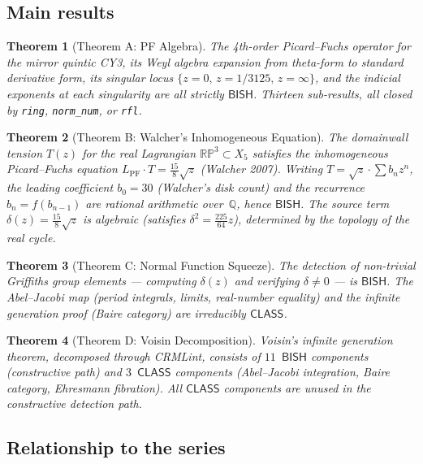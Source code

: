 \documentclass[11pt]{article}
\theoremstyle{plain}
\newtheorem{theorem}{Theorem}[section]
\theoremstyle{definition}
\theoremstyle{remark}
\newcommand{\Q}{\mathbb{Q}}
\newcommand{\R}{\mathbb{R}}
\newcommand{\PP}{\mathbb{P}}
\newcommand{\BISH}{\ensuremath{\mathsf{BISH}}}
\newcommand{\CLASS}{\ensuremath{\mathsf{CLASS}}}
\begin{document}
\subsection{Main results}

\begin{theorem}[Theorem A: PF Algebra]
The 4th-order Picard--Fuchs operator for the mirror quintic CY3, its Weyl algebra expansion from theta-form to standard derivative form, its singular locus $\{z = 0,\, z = 1/3125,\, z = \infty\}$, and the indicial exponents at each singularity are all strictly $\BISH$. Thirteen sub-results, all closed by \texttt{ring}, \texttt{norm\_num}, or \texttt{rfl}.
\end{theorem}

\begin{theorem}[Theorem B: Walcher's Inhomogeneous Equation]
The domainwall tension $T(z)$ for the real Lagrangian $\R\PP^3 \subset X_5$ satisfies the inhomogeneous Picard--Fuchs equation $L_{\mathrm{PF}} \cdot T = \tfrac{15}{8}\sqrt{z}$ (Walcher 2007). Writing $T = \sqrt{z}\cdot\sum b_n z^n$, the leading coefficient $b_0 = 30$ (Walcher's disk count) and the recurrence $b_n = f(b_{n-1})$ are rational arithmetic over~$\Q$, hence $\BISH$. The source term $\delta(z) = \tfrac{15}{8}\sqrt{z}$ is algebraic (satisfies $\delta^2 = \tfrac{225}{64}z$), determined by the topology of the real cycle.
\end{theorem}

\begin{theorem}[Theorem C: Normal Function Squeeze]
The detection of non-trivial Griffiths group elements --- computing $\delta(z)$ and verifying $\delta \neq 0$ --- is $\BISH$. The Abel--Jacobi map (period integrals, limits, real-number equality) and the infinite generation proof (Baire category) are irreducibly $\CLASS$.
\end{theorem}

\begin{theorem}[Theorem D: Voisin Decomposition]
Voisin's infinite generation theorem, decomposed through CRMLint, consists of $11$~$\BISH$ components (constructive path) and $3$~$\CLASS$ components (Abel--Jacobi integration, Baire category, Ehresmann fibration). All $\CLASS$ components are unused in the constructive detection path.
\end{theorem}

\subsection{Relationship to the series}
\end{document}
